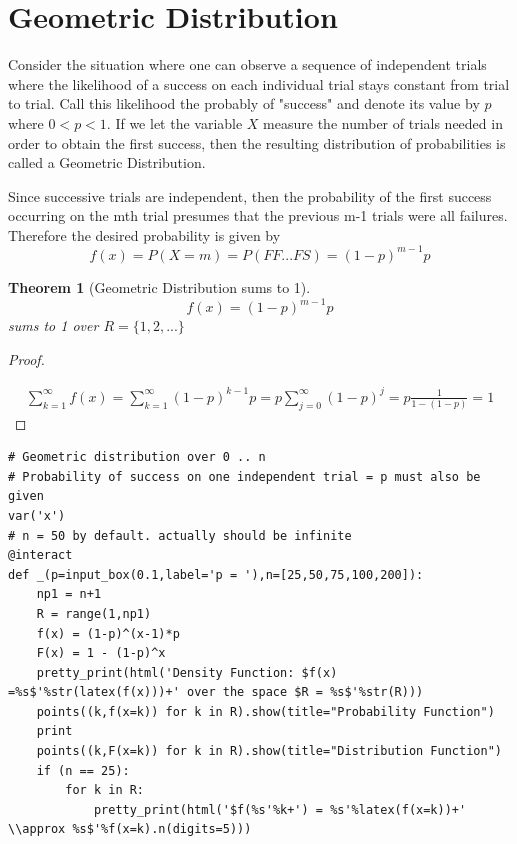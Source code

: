 \documentclass[10pt,]{book}
\theoremstyle{plain}
\newtheorem{theorem}{Theorem}[section]
\theoremstyle{definition}
\theoremstyle{definition}
\theoremstyle{definition}
\numberwithin{equation}{section}
\newcommand{\lt}{ < }
\begin{document}
\section[{Geometric Distribution}]{Geometric Distribution}\label{section-31}
Consider the situation where one can observe a sequence  of independent
	trials where the likelihood of a success on each individual trial
	stays constant from trial to trial. Call this likelihood the probably of
	"success" and denote its value by \(p\) 
	where \( 0 \lt p \lt 1 \).  
	If we let the variable \(X\) measure the number of trials needed in order
	to obtain the first success, 
	then the resulting distribution of probabilities is called a 
	Geometric Distribution.%
\par
 Since successive trials are independent, then the probability 
	of the first success occurring on the mth trial presumes that
	the previous m-1 trials were all failures.  Therefore the 
	desired probability is given by 
		\begin{equation*}f(x) = P(X=m) = P(FF...FS) = (1-p)^{m-1}p\end{equation*}
\begin{theorem}[{Geometric Distribution sums to 1}]\label{theorem-41}
\begin{equation*}f(x) = (1-p)^{m-1}p\end{equation*} sums to 1 over \(R = \{ 1, 2, ... \}\)\end{theorem}
\begin{proof}\hypertarget{proof-38}{}

		\begin{gather*}
\sum_{k=1}^{\infty} {f(x)} = \sum_{k=1}^{\infty} {(1-p)^{k-1} p} = p \sum_{j=0}^{\infty} {(1-p)^j} = p \frac{1}{1-(1-p)} = 1
\end{gather*}
\end{proof}
\begin{lstlisting}[style=sageinput]
# Geometric distribution over 0 .. n
# Probability of success on one independent trial = p must also be given
var('x')
# n = 50 by default. actually should be infinite
@interact
def _(p=input_box(0.1,label='p = '),n=[25,50,75,100,200]):
    np1 = n+1
    R = range(1,np1)
    f(x) = (1-p)^(x-1)*p
    F(x) = 1 - (1-p)^x
    pretty_print(html('Density Function: $f(x) =%s$'%str(latex(f(x)))+' over the space $R = %s$'%str(R)))
    points((k,f(x=k)) for k in R).show(title="Probability Function")
    print
    points((k,F(x=k)) for k in R).show(title="Distribution Function")
    if (n == 25):
        for k in R:
            pretty_print(html('$f(%s'%k+') = %s'%latex(f(x=k))+' \\approx %s$'%f(x=k).n(digits=5)))
\end{lstlisting}
\end{document}
